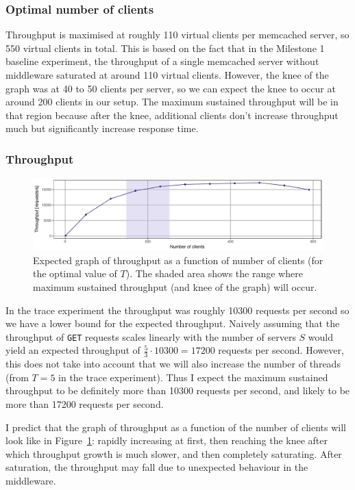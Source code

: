 \documentclass[11pt]{article}
\newcommand{\get}[0]{\texttt{GET}}
\begin{document}
\subsubsection{Optimal number of clients}
Throughput is maximised at roughly 110 virtual clients per memcached server, so 550 virtual clients in total. This is based on the fact that in the Milestone 1 baseline experiment, the throughput of a single memcached server without middleware saturated at around 110 virtual clients. However, the knee of the graph was at 40 to 50 clients per server, so we can expect the knee to occur at around 200 clients in our setup. The maximum sustained throughput will be in that region because after the knee, additional clients don't increase throughput much but significantly increase response time.

\subsubsection{Throughput}

\begin{figure}[h]
\centering
\includegraphics[width=\textwidth]{figures/hypothesis_throughput.pdf}
\caption{Expected graph of throughput as a function of number of clients (for the optimal value of $T$). The shaded area shows the range where maximum sustained throughput (and knee of the graph) will occur.}
\label{fig:exp1:hyp:throughput}
\end{figure}

In the trace experiment the throughput was roughly 10300 requests per second so we have a lower bound for the expected throughput. Naively assuming that the throughput of \get{} requests scales linearly with the number of servers $S$ would yield an expected throughput of $\frac{5}{3} \cdot 10300 = 17200$ requests per second. However, this does not take into account that we will also increase the number of threads (from $T=5$ in the trace experiment). Thus I expect the maximum sustained throughput to be definitely more than 10300 requests per second, and likely to be more than 17200 requests per second.

I predict that the graph of throughput as a function of the number of clients will look like in Figure~\ref{fig:exp1:hyp:throughput}: rapidly increasing at first, then reaching the knee after which throughput growth is much slower, and then completely saturating. After saturation, the throughput may fall due to unexpected behaviour in the middleware.
\end{document}
